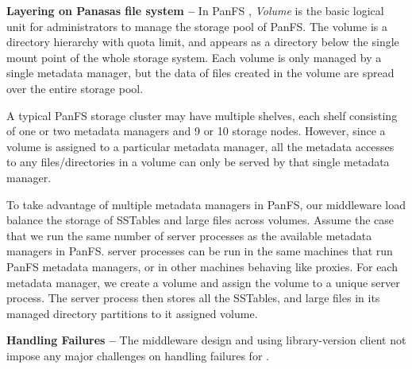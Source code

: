 \textbf{Layering on Panasas file system -- }
In PanFS \cite{PanFS}, \textit{Volume} is the basic logical unit
for administrators to manage the storage pool of PanFS.
The volume is a directory hierarchy with quota limit, and appears
as a directory below the single mount point of the whole storage system.
Each volume is only managed by a single metadata manager, but
the data of files created in the volume are spread over the entire storage pool.

A typical PanFS storage cluster may have multiple shelves,
each shelf consisting of one or two metadata managers and 9 or 10 storage nodes.
However, since a volume is assigned to a particular metadata manager,
all the metadata accesses to any files/directories in a volume
can only be served by that single metadata manager.

To take advantage of multiple metadata managers in PanFS,
our middleware load balance the storage of SSTables and large files across volumes.
Assume the case that we run the same number of \sys server processes
as the available metadata managers in PanFS.
\sys server processes can be run in the same machines that run PanFS metadata managers,
or in other machines behaving like proxies.
For each metadata manager, we create a volume and assign the volume
to a unique \sys server process.
The \sys server process then stores all the SSTables,
and large files in its managed directory partitions to it assigned volume.

\textbf{Handling Failures -- }
The middleware design and using library-version client not impose
any major challenges on handling failures for \sys.





